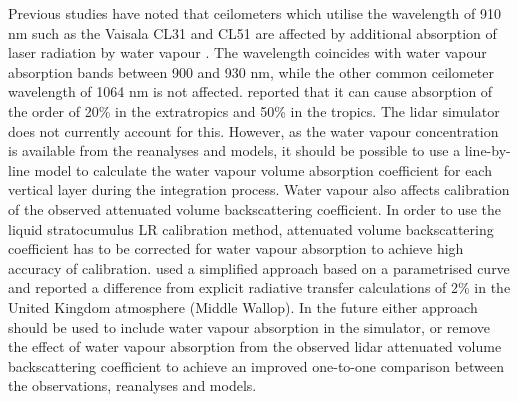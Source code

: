 \begin{table}[t]
\caption[Location of sites and instruments]{Location of sites and instruments. The time periods are inclusive.}
\label{tab:3:case-studies}
\centerline{}
\end{table}

Previous studies have noted that ceilometers which utilise the wavelength
of 910 nm such as the Vaisala CL31 and CL51 are affected by additional
absorption of laser radiation by water vapour \citep{wiegner2015,wiegner2019,hopkin2019}.
The wavelength coincides with water vapour absorption bands between 900 and 930
nm, while the other common ceilometer wavelength of 1064 nm is not affected.
\cite{wiegner2015} reported that it can cause absorption of the order of 20\% in
the extratropics and 50\% in the tropics. The lidar simulator does not currently
account for this. However, as the water vapour concentration is available
from the reanalyses and models, it should be possible to use a line-by-line
model to calculate the water vapour volume absorption coefficient for each
vertical layer during the integration process. Water vapour also affects
calibration of the observed attenuated volume backscattering coefficient. In order to use the liquid stratocumulus
LR calibration method, attenuated volume backscattering coefficient has to be corrected for
water vapour absorption to achieve high accuracy of calibration.
\cite{hopkin2019} used a simplified approach based on a parametrised curve
and reported a difference from explicit radiative transfer calculations
of 2\% in the United Kingdom atmosphere (Middle Wallop). In the future either approach
should be used to include water vapour absorption in the simulator, or
remove the effect of water vapour absorption from the observed lidar attenuated volume backscattering coefficient
to achieve an improved one-to-one comparison between the observations,
reanalyses and models.

